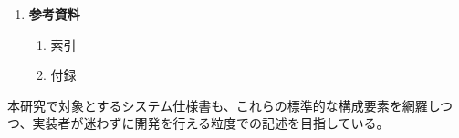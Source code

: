 \begin{enumerate}
    \item \textbf{参考資料}
    \begin{enumerate}[label=4.\arabic*]
        \item 索引
        \item 付録
    \end{enumerate}
\end{enumerate}

本研究で対象とするシステム仕様書も、これらの標準的な構成要素を網羅しつつ、実装者が迷わずに開発を行える粒度での記述を目指している。

\fi


